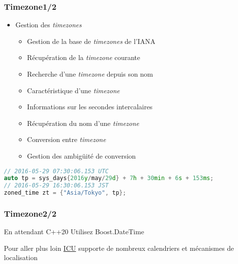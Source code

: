 \documentclass[C++.tex]{subfiles}
\begin{document}
\begin{frame}[fragile]
	\frametitle{Timezone\titlehfill{}1/2}
	\begin{itemize}
		\item Gestion des \textit{timezones}
		\begin{itemize}
			\item Gestion de la base de \textit{timezones} de l'IANA


			\item Récupération de la \textit{timezone} courante
			\item Recherche d'une \textit{timezone} depuis son nom
			\item Caractéristique d'une \textit{timezone}
			\item Informations sur les secondes intercalaires
			\item Récupération du nom d'une \textit{timezone}
			\item Conversion entre \textit{timezone}
			\item Gestion des ambigüité de conversion
		\end{itemize}
	\end{itemize}

	\begin{lstlisting}[language=C++]
// 2016-05-29 07:30:06.153 UTC
auto tp = sys_days{2016y/may/29d} + 7h + 30min + 6s + 153ms; 
// 2016-05-29 16:30:06.153 JST
zoned_time zt = {"Asia/Tokyo", tp};\end{lstlisting}
\end{frame}

\begin{frame}[fragile]
	\frametitle{Timezone\titlehfill{}2/2}
	\begin{block}{En attendant C++20}
		Utilisez Boost.DateTime
	\end{block}

	\begin{block}{Pour aller plus loin}
		\href{http://site.icu-project.org/home}{ICU} supporte de nombreux calendriers et mécanismes de localisation

	\end{block}
\end{frame}
\end{document}
